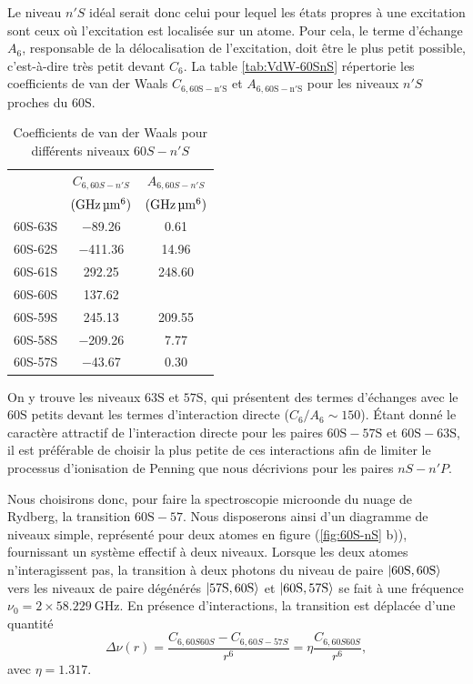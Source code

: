 Le niveau $n'S$ idéal serait donc celui pour lequel les états propres à une excitation sont ceux où l'excitation est localisée sur un atome.
Pour cela, le terme d'échange $A_6$, responsable de la délocalisation de l'excitation, doit être le plus petit possible, c'est-à-dire très petit devant $C_6$.
La table \eqref{tab:VdW-60SnS} répertorie les coefficients de van der Waals $C_{6,\mathrm{60S-n'S}}$ et $A_{6,\mathrm{60S-n'S}}$ pour les niveaux $n'S$ proches du $\mathrm{60S}$.
%
\begin{table}[!h]
	\centering
	\caption[Coefficients de van der Waals pour différents niveaux $60S-n'S$]{Coefficients de van der Waals pour différents niveaux $60S-n'S$
	}
	\label{tab:VdW-60SnS}
	\begin{tabular}{c c c}
		\toprule\midrule
		~
		& $C_{6,60S-n'S}$
		& $A_{6,60S-n'S}$\\		
		~
		& $(\si{\GHz\raiseto{6}\um})$
		& $(\si{\GHz\raiseto{6}\um})$\\
		\midrule
		60S-63S & \SI{-89.26}{} & \SI{0.61}{} \\
		60S-62S & \SI{-411.36}{} & \SI{14.96}{} \\
		60S-61S & \SI{292.25}{} & \SI{248.60}{} \\
		60S-60S & \SI{137.62}{} & \SI{}{} \\
		60S-59S & \SI{245.13}{} & \SI{209.55}{} \\
		60S-58S & \SI{-209.26}{} & \SI{7.77}{} \\
		60S-57S & \SI{-43.67}{} & \SI{0.30}{} \\
		\midrule
		\bottomrule
 	\end{tabular}
\end{table}
%
On y trouve les niveaux $\mathrm{63S}$ et $\mathrm{57S}$, qui présentent des termes d'échanges avec le $\mathrm{60S}$ petits devant les termes d'interaction directe ($C_6 / A_6 \sim 150$).
Étant donné le caractère attractif de l'interaction directe pour les paires $\mathrm{60S-57S}$ et $\mathrm{60S-63S}$, il est préférable de choisir la plus petite de ces interactions afin de limiter le processus d'ionisation de Penning que nous décrivions pour les paires $nS-n'P$.

Nous choisirons donc, pour faire la spectroscopie microonde du nuage de Rydberg, la transition $\mathrm{60S-57}$.
Nous disposerons ainsi d'un diagramme de niveaux simple, représenté pour deux atomes en figure (\ref{fig:60S-nS} b)), fournissant un système effectif à deux niveaux.
Lorsque les deux atomes n'interagissent pas, la transition à deux photons du niveau de paire $\ket{\mathrm{60S,60S}}$ vers les niveaux de paire dégénérés $\ket{\mathrm{57S,60S}}$ et $\ket{\mathrm{60S,57S}}$ se fait à une fréquence $\nu_0 = 2\times \SI{58.229}{\GHz}$.
En présence d'interactions, la transition est déplacée d'une quantité
\begin{equation}
\label{eq:60s-57s_2atoms}
\Delta\nu (r) = \frac{C_{6,60S60S}-C_{6,60S-57S}}{r^6} = \eta \frac{C_{6,60S60S}}{r^6},
\end{equation}
avec $\eta = \num{1.317}$.

